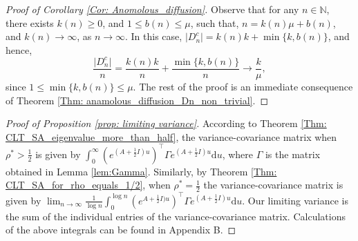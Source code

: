 \documentclass{article}
\numberwithin{equation}{section}
\newcommand{\bN}{\mbox{${\mathbb N}$}}
\newcommand{\1}{\mathbf{1}}
\newcommand{\0}{\mathbf{0}}
\begin{document}
\begin{proof}
[Proof of Corollary \ref{Cor: Anomolous_diffusion}]
 Observe that for any $n \in \bN$, there exists $k(n) \ge 0$, and $1 \le b(n) \le \mu$, such that, $n = k(n) \mu +b(n)$, and $k(n) \to \infty$, as $n \to \infty$. In this case, $\lvert D_n^c\rvert = k(n)k+ \min\{k, b(n)\}$, and hence,
\[
\frac{\lvert D_n^c\rvert}{n}= \frac{k(n)k}{n}+ \frac{\min\{k, b(n)\}}{n} \longrightarrow \frac{k}{\mu}, 
\]
since $1 \le \min\{k, b(n)\} \le \mu$.
The rest of the proof is an immediate consequence of Theorem \ref{Thm: anamolous_diffusion_Dn_non_trivial}.
\end{proof}
\begin{proof}[Proof of Proposition \ref{prop: limiting variance}] 
According to Theorem \ref{Thm: CLT_SA_eigenvalue_more_than_half}, the variance-covariance matrix when $\rho^*>\frac{1}{2}$ is given by $\int_{0}^{\infty}{\left(e^{(A+\frac{1}{2}I) u}\right)^\top \Gamma e^{(A+\frac{1}{2}I) u} \mathrm{d}u}$,
where $\Gamma$ is the matrix obtained in Lemma \ref{lem:Gamma}. Similarly, by Theorem \ref{Thm: CLT_SA_for_rho_equals_1/2}, when $\rho^*=\frac{1}{2}$ the variance-covariance matrix is given by $ \lim_{n \to \infty}\frac{1}{\log n}\int_{0}^{\log n} {\left(e^{A+\frac{1}{2}I) u}\right)^\top \Gamma e^{(A+\frac{1}{2}I) u} \mathrm{d}u}$. Our limiting variance is the sum of the individual entries of the variance-covariance matrix. Calculations of the above integrals can be found in Appendix B.
\end{proof}
\end{document}
